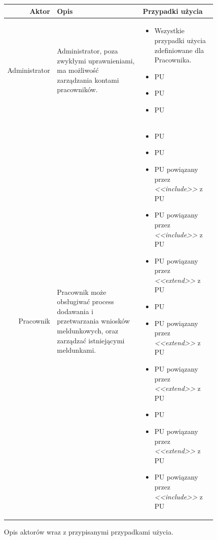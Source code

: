 \documentclass[12pt]{article}
\begin{document}
\begin{figure}[!h]
    \centering
    \begin{tabular}{|r|p{4cm}|p{10cm}|}
        \hline
        \textbf{Aktor} & \textbf{Opis} & \textbf{Przypadki użycia} \\
        \hline
        Administrator & 
        Administrator, poza zwykłymi uprawnieniami, ma możliwość zarządzania kontami pracowników.
        & 
        \begin{itemize}[noitemsep]
            \item Wszystkie przypadki użycia zdefiniowane dla Pracownika.
            \item PU \nameref{Stworzenie konta pracownika}
            \item PU \nameref{Edycja konta pracownika}
            \item PU \nameref{Usunięcie konta pracownika}
        \end{itemize}
        \\
        \hline
        Pracownik & 
        Pracownik może obsługiwać process dodawania i przetwarzania wniosków meldunkowych, oraz zarządzać istniejącymi meldunkami.
        & 
        \begin{itemize}[noitemsep]
            \item PU \nameref{Zalogowanie}
            \item PU \nameref{Wylogowanie}
            \item PU \nameref{Dodanie wniosku} powiązany przez \textit{<<include>>} z PU \nameref{Sprawdzenie poprawności danych}
            \item PU \nameref{Edycja danych wniosku} powiązany przez \textit{<<include>>} z PU \nameref{Sprawdzenie poprawności danych}
            \item PU \nameref{Zmiana statusu wniosku} powiązany przez \textit{<<extend>>} z PU \nameref{Edycja danych wniosku}
            \item PU \nameref{Wyświetlanie wniosków}
            \item PU \nameref{Zmiana kryterium wyświetlania wniosków} powiązany przez \textit{<<extend>>} z PU \nameref{Wyświetlanie wniosków}
            \item PU \nameref{Dodanie meldunku} powiązany przez \textit{<<extend>>} z PU \nameref{Zmiana statusu wniosku}
            \item PU \nameref{Wyświetlanie meldunków}
            \item PU \nameref{Zmiana kryterium wyświetlania meldunków} powiązany przez \textit{<<extend>>} z PU \nameref{Wyświetlanie meldunków}
            \item PU \nameref{Edycja danych meldunku} powiązany przez \textit{<<include>>} z PU \nameref{Sprawdzenie poprawności danych}

        \end{itemize}
        \\
        \hline
    \end{tabular}
    \caption{Opis aktorów wraz z przypisanymi przypadkami użycia.}
\end{figure}
\end{document}
